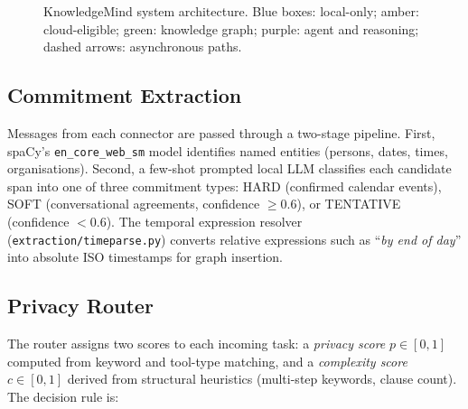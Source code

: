 \documentclass[10pt,twocolumn]{article}
\begin{document}
\begin{figure}[h]
{}%
\caption{KnowledgeMind system architecture.
  Blue boxes: local-only; amber: cloud-eligible; green: knowledge graph;
  purple: agent and reasoning; dashed arrows: asynchronous paths.}
\label{fig:arch}
\end{figure}

\subsection{Commitment Extraction}

Messages from each connector are passed through a two-stage pipeline.
First, spaCy's \texttt{en\_core\_web\_sm} model identifies named entities
(persons, dates, times, organisations).
Second, a few-shot prompted local LLM classifies each candidate span into one
of three commitment types: HARD (confirmed calendar events), SOFT
(conversational agreements, confidence $\geq 0.6$), or TENTATIVE (confidence
$< 0.6$).
The temporal expression resolver (\texttt{extraction/timeparse.py}) converts
relative expressions such as ``\emph{by end of day}'' into absolute ISO
timestamps for graph insertion.

\subsection{Privacy Router}

The router assigns two scores to each incoming task: a \emph{privacy score}
$p \in [0,1]$ computed from keyword and tool-type matching, and a
\emph{complexity score} $c \in [0,1]$ derived from structural heuristics
(multi-step keywords, clause count).
The decision rule is:
\end{document}
